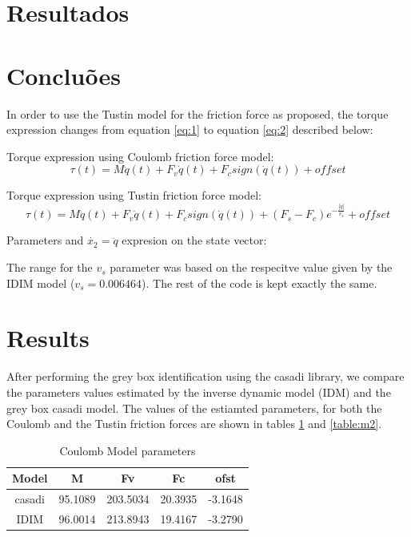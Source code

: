 \documentclass[10pt, a4paper]{article}
\begin{document}
\section{Resultados}

\section{Conclu\~oes}

In order to use the Tustin model for the friction force as proposed, the torque expression changes from equation \ref{eq:1} to equation \ref{eq:2} described below:     \newline


Torque expression using Coulomb friction force model:
\begin{equation}\label{eq:1}
      \tau(t) = M\ddot{q}(t) + F_{v}\dot{q}(t) + F_{c}sign(\dot{q}(t)) + offset
\end{equation}

Torque expression using Tustin friction force model:
\begin{equation}\label{eq:2}
      \tau(t) = M\ddot{q}(t) + F_{v}\dot{q}(t) + F_{c}sign(\dot{q}(t)) + (F_{s} - F_{c})e^{-\frac{|\dot{q}|}{v_{s}}} + offset
\end{equation}


Parameters and $\dot{x_{2}}=\ddot{q}$ expresion on the state vector: \\


The range for the $v_{s}$ parameter was based on the respecitve value given by the IDIM model ($v_{s} = 0.006464$). The rest of the code is kept exactly the same.

\section{Results}

After performing the grey box identification using the casadi library, we compare the parameters values estimated by the inverse dynamic model (IDM) and the grey box casadi model. The values of the estiamted parameters, for both the Coulomb and the Tustin friction forces are shown in tables \ref{table:m1} and \ref{table:m2}.

\begin{table}[H]
      \small
      \centering
      \caption{Coulomb Model parameters}
      \begin{tabular}{c|c|c|c|c}
            Model &  M & Fv & Fc & ofst \\
            \hline
            casadi & 95.1089 & 203.5034 & 20.3935 & -3.1648 \\
            IDIM   & 96.0014 & 213.8943 & 19.4167 & -3.2790 \\
      \end{tabular}
      \label{table:m1}
\end{table}
\end{document}
